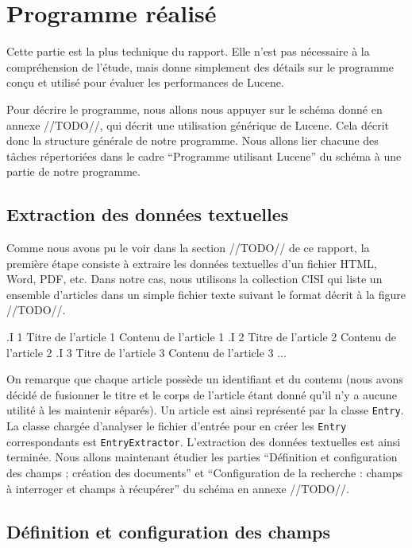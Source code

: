 \section{Programme réalisé}

Cette partie est la plus technique du rapport. Elle n’est pas nécessaire à la compréhension de l’étude, mais donne simplement des détails sur le programme conçu et utilisé pour évaluer les performances de Lucene.

Pour décrire le programme, nous allons nous appuyer sur le schéma donné en annexe //TODO//, qui décrit une utilisation générique de Lucene. Cela décrit donc la structure générale de notre programme. Nous allons lier chacune des tâches répertoriées dans le cadre “Programme utilisant Lucene” du schéma à une partie de notre programme.

\subsection{Extraction des données textuelles}

Comme nous avons pu le voir dans la section //TODO// de ce rapport, la première étape consiste à extraire les données textuelles d’un fichier HTML, Word, PDF, etc. Dans notre cas, nous utilisons la collection CISI qui liste un ensemble d’articles dans un simple fichier texte suivant le format décrit à la figure //TODO//.

.I 1
Titre de l’article 1
Contenu de l’article 1
.I 2
Titre de l’article 2
Contenu de l’article 2
.I 3
Titre de l’article 3
Contenu de l’article 3
...

On remarque que chaque article possède un identifiant et du contenu (nous avons décidé de fusionner le titre et le corps de l’article étant donné qu’il n’y a aucune utilité à les maintenir séparés). Un article est ainsi représenté par la classe \texttt{Entry}. La classe chargée d’analyser le fichier d’entrée pour en créer les \texttt{Entry} correspondants est \texttt{EntryExtractor}.
L’extraction des données textuelles est ainsi terminée. Nous allons maintenant étudier les parties “Définition et configuration des champs ; création des documents” et “Configuration de la recherche : champs à interroger et champs à récupérer” du schéma en annexe //TODO//.

\subsection{Définition et configuration des champs}

